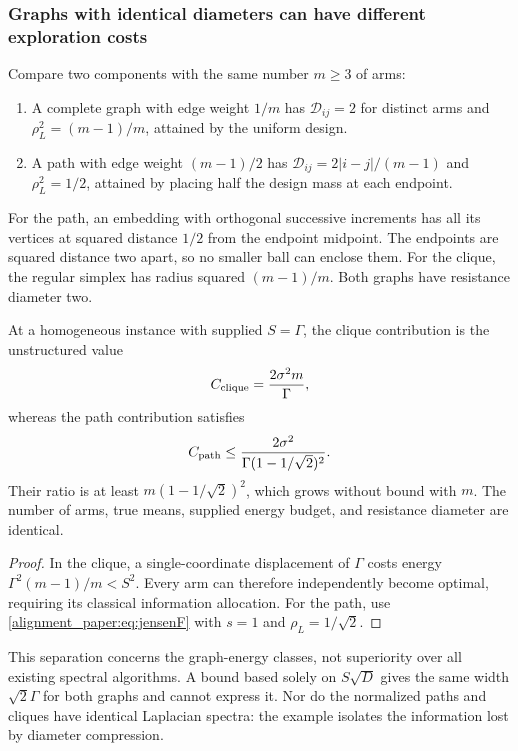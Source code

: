 \subsubsection{Graphs with identical diameters can have different exploration costs}
Compare two components with the same number $m\ge3$ of arms:
\begin{enumerate}
 \item A complete graph with edge weight $1/m$ has $\mathcal D_{ij}=2$ for distinct arms and $\rho_L^2=(m-1)/m$, attained by the uniform design.
 \item A path with edge weight $(m-1)/2$ has $\mathcal D_{ij}=2|i-j|/(m-1)$ and $\rho_L^2=1/2$, attained by placing half the design mass at each endpoint.
\end{enumerate}
For the path, an embedding with orthogonal successive increments has all its vertices at squared distance $1/2$ from the endpoint midpoint. The endpoints are squared distance two apart, so no smaller ball can enclose them. For the clique, the regular simplex has radius squared $(m-1)/m$. Both graphs have resistance diameter two.

\begin{corollary}
At a homogeneous instance with supplied $S=\Gamma$, the clique contribution is the unstructured value
\begin{equation}
 C_{\rm clique}=\frac{2\sigma^2m}{\Gamma},
 \label{alignment_paper:eq:cliqueseparation}
\end{equation}
whereas the path contribution satisfies
\begin{equation}
 C_{\rm path}\le
 \frac{2\sigma^2}{\Gamma(1-1/\sqrt2)^2}.
 \label{alignment_paper:eq:pathinformation}
\end{equation}
Their ratio is at least $m(1-1/\sqrt2)^2$, which grows without bound with $m$. The number of arms, true means, supplied energy budget, and resistance diameter are identical.
\label{alignment_paper:cor:informationseparation}
\end{corollary}
\begin{proof}
In the clique, a single-coordinate displacement of $\Gamma$ costs energy $\Gamma^2(m-1)/m< S^2$. Every arm can therefore independently become optimal, requiring its classical information allocation. For the path, use \eqref{alignment_paper:eq:jensenF} with $s=1$ and $\rho_L=1/\sqrt2$.
\end{proof}
This separation concerns the graph-energy classes, not superiority over all existing spectral algorithms. A bound based solely on $S\sqrt D$ gives the same width $\sqrt2\Gamma$ for both graphs and cannot express it. Nor do the normalized paths and cliques have identical Laplacian spectra: the example isolates the information lost by diameter compression.

